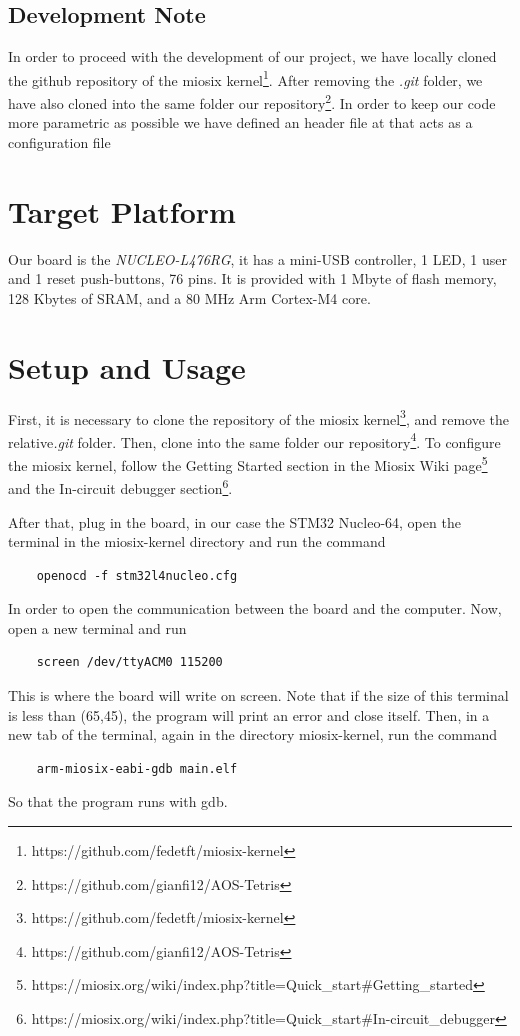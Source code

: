 \documentclass{article}
\begin{document}
\subsection{Development Note}
In order to proceed with the development of our project, we have locally cloned the github repository of the miosix kernel\footnote{https://github.com/fedetft/miosix-kernel}.
After removing the \emph{.git} folder, we have also cloned into the same folder our repository\footnote{https://github.com/gianfi12/AOS-Tetris}.
In order to keep our code more parametric as possible we have defined an header file at  that acts as a configuration file

\section{Target Platform}
Our board is the \emph{NUCLEO-L476RG}, it has a mini-USB controller, 1 LED, 1 user and 1 reset push-buttons, 76 pins.
It is provided with 1 Mbyte of flash memory, 128 Kbytes of SRAM, and a 80 MHz Arm Cortex-M4 core.

\section{Setup and Usage}
First, it is necessary to clone the repository of the miosix kernel\footnote{https://github.com/fedetft/miosix-kernel}, and remove the relative\emph{.git} folder.\newline
Then, clone into the same folder our repository\footnote{https://github.com/gianfi12/AOS-Tetris}.\newline
To configure the miosix kernel, follow the Getting Started section in the Miosix Wiki page\footnote{https://miosix.org/wiki/index.php?title=Quick\_start\#Getting\_started} 
and the In-circuit debugger section\footnote{https://miosix.org/wiki/index.php?title=Quick\_start\#In-circuit\_debugger}.\newline

After that, plug in the board, in our case the STM32 Nucleo-64, open the terminal in the miosix-kernel directory and run the command
\begin{verbatim}
    openocd -f stm32l4nucleo.cfg
\end{verbatim}
In order to open the communication between the board and the computer.\newline
Now, open a new terminal and run
\begin{verbatim}
    screen /dev/ttyACM0 115200
\end{verbatim}
This is where the board will write on screen. Note that if the size of this terminal is less than (65,45), the program will print an error and close itself.
Then, in a new tab of the terminal, again in the directory miosix-kernel, run the command
\begin{verbatim}
    arm-miosix-eabi-gdb main.elf
\end{verbatim}
So that the program runs with gdb.
\end{document}
